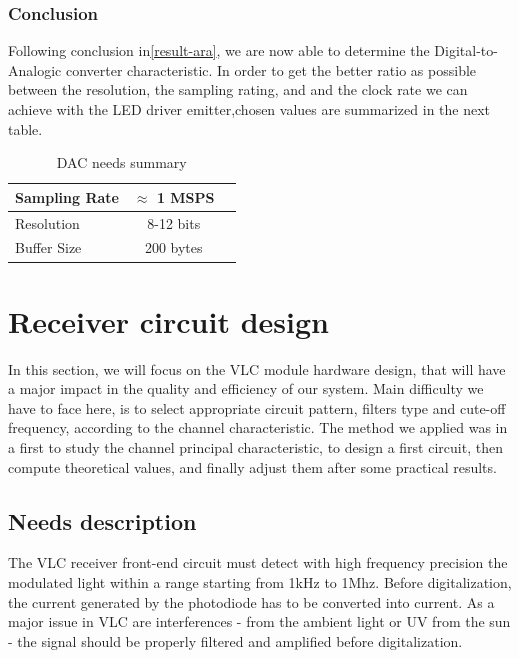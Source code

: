 \subsubsection{Conclusion}
{
Following conclusion in\ref{result-ara}, we are now able to determine the Digital-to-Analogic converter characteristic. In order to get the better ratio as possible between the resolution, the sampling rating, and and the clock rate we can achieve with the LED driver emitter,chosen values are summarized in the next table.

\begin{table}[htbp]
\begin{center}
\begin{tabular}{|l|c|r|}
  \hline
  Sampling Rate & $\approx$ 1 MSPS \\
  \hline
  Resolution & 8-12 bits \\
  \hline
  Buffer Size & 200 bytes\\
  \hline
\end{tabular}
\end{center}
\caption{DAC needs summary}
\label{tab:conclusion-adc}
\end{table}
}


\section{Receiver circuit design}

In this section, we will focus on the VLC module hardware design, that will have a major impact in the quality and efficiency of our system. Main difficulty we have to face here, is to select appropriate circuit pattern, filters type and cute-off frequency, according to the channel characteristic. The method we applied was in a first to study the channel principal characteristic, to design a first circuit, then compute theoretical values, and finally adjust them after some practical results. 

\subsection{Needs description}

The VLC receiver front-end circuit must detect with high frequency precision the modulated light within a range starting from 1kHz to 1Mhz. Before digitalization, the current generated by the photodiode has to be converted into current.
As a major issue in VLC are interferences - from the ambient light or UV from the sun - the signal should be properly filtered and amplified before digitalization.

